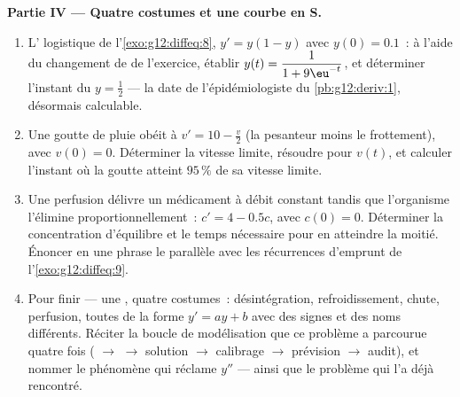\begin{problem}
\medskip
\noindent\textbf{Partie IV --- Quatre costumes et une courbe en S.}
\begin{enumerate}[resume]
  \item L' logistique de l'\cref{exo:g12:diffeq:8},
        $y' = y(1 - y)$ avec $y(0) = 0.1$~: à l'aide du changement
        de  de l'exercice, établir
        $y(t) = \dfrac{1}{1 + 9\eu^{-t}}$, et déterminer l'instant
        du  $y = \frac12$ --- la date de
        l'épidémiologiste du \cref{pb:g12:deriv:1}, désormais
        calculable.
  \item Une goutte de pluie obéit à $v' = 10 - \frac v2$ (la
        pesanteur moins le frottement), avec $v(0) = 0$. Déterminer
        la vitesse limite, résoudre pour $v(t)$, et calculer
        l'instant où la goutte atteint $95\,\%$ de sa vitesse
        limite.
  \item Une perfusion délivre un médicament à débit constant tandis
        que l'organisme l'élimine proportionnellement~:
        $c' = 4 - 0.5c$, avec $c(0) = 0$. Déterminer la
        concentration d'équilibre et le temps nécessaire pour en
        atteindre la moitié. Énoncer en une phrase le parallèle avec
        les récurrences d'emprunt de l'\cref{exo:g12:diffeq:9}.
  \item Pour finir --- une , quatre costumes~:
        désintégration, refroidissement, chute, perfusion, toutes de
        la forme $y' = ay + b$ avec des signes et des noms
        différents. Réciter la boucle de modélisation que ce
        problème a parcourue quatre fois ( $\to$  $\to$
        solution $\to$ calibrage $\to$ prévision $\to$ audit), et
        nommer le phénomène qui réclame $y''$ --- ainsi que le
        problème qui l'a déjà rencontré.
\end{enumerate}
\end{problem}
